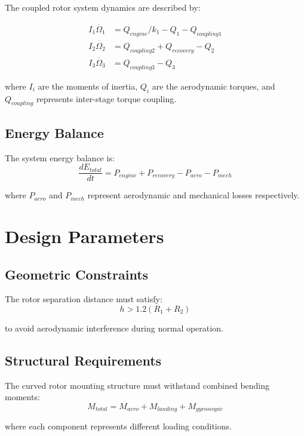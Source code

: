\documentclass[12pt,a4paper]{article}
\begin{document}
The coupled rotor system dynamics are described by:

\begin{align}
I_1\dot{\Omega_1} &= Q_{engine}/k_1 - Q_1 - Q_{coupling1} \\
I_2\dot{\Omega_2} &= Q_{coupling2} + Q_{recovery} - Q_2 \\
I_3\dot{\Omega_3} &= Q_{coupling3} - Q_3
\end{align}

where $I_i$ are the moments of inertia, $Q_i$ are the aerodynamic torques, and $Q_{coupling}$ represents inter-stage torque coupling.

\subsection{Energy Balance}

The system energy balance is:
\begin{equation}
\frac{dE_{total}}{dt} = P_{engine} + P_{recovery} - P_{aero} - P_{mech}
\end{equation}

where $P_{aero}$ and $P_{mech}$ represent aerodynamic and mechanical losses respectively.

\section{Design Parameters}

\subsection{Geometric Constraints}

The rotor separation distance must satisfy:
\begin{equation}
h > 1.2(R_1 + R_2)
\end{equation}

to avoid aerodynamic interference during normal operation.

\subsection{Structural Requirements}

The curved rotor mounting structure must withstand combined bending moments:
\begin{equation}
M_{total} = M_{aero} + M_{landing} + M_{gyroscopic}
\end{equation}

where each component represents different loading conditions.
\end{document}
